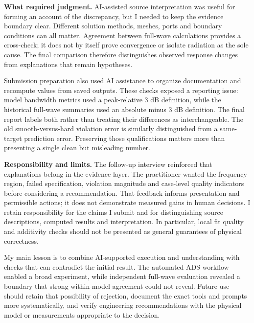 \documentclass[11pt,letterpaper]{article}
\begin{document}
\newpage
\textbf{What required judgment.}
AI-assisted source interpretation was useful for forming an account of the discrepancy, but I needed to keep the evidence boundary clear. Different solution methods, meshes, ports and boundary conditions can all matter. Agreement between full-wave calculations provides a cross-check; it does not by itself prove convergence or isolate radiation as the sole cause. The final comparison therefore distinguishes observed response changes from explanations that remain hypotheses.

Submission preparation also used AI assistance to organize documentation and recompute values from saved outputs. These checks exposed a reporting issue: model bandwidth metrics used a peak-relative 3 dB definition, while the historical full-wave summaries used an absolute minus 3 dB definition. The final report labels both rather than treating their differences as interchangeable. The old smooth-versus-hard violation error is similarly distinguished from a same-target prediction error. Preserving those qualifications matters more than presenting a single clean but misleading number.

\textbf{Responsibility and limits.}
The follow-up interview reinforced that explanations belong in the evidence layer. The practitioner wanted the frequency region, failed specification, violation magnitude and case-level quality indicators before considering a recommendation. That feedback informs presentation and permissible actions; it does not demonstrate measured gains in human decisions. I retain responsibility for the claims I submit and for distinguishing source descriptions, computed results and interpretation. In particular, local fit quality and additivity checks should not be presented as general guarantees of physical correctness.

My main lesson is to combine AI-supported execution and understanding with checks that can contradict the initial result. The automated ADS workflow enabled a broad experiment, while independent full-wave evaluation revealed a boundary that strong within-model agreement could not reveal. Future use should retain that possibility of rejection, document the exact tools and prompts more systematically, and verify engineering recommendations with the physical model or measurements appropriate to the decision.
\end{document}

